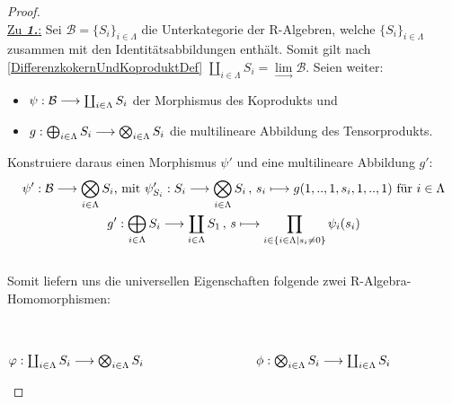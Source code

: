 \documentclass[10pt,a4paper]{report}
\newcommand{\functionfront}[3]{\nolinebreak{#1:#2 \longrightarrow #3}}
\newcommand{\function}[5]{\nolinebreak{#1:#2 \longrightarrow #3 \, , \, #4 \longmapsto #5}}
\newcommand{\colimes}[0]{\lim\limits_{ \longrightarrow }}
\begin{document}
\begin{proof} \ \\
\underline{Zu \textit{\textbf{1.}}:} Sei $\mathcal{B} = \lbrace S_i \rbrace_{i \in \Lambda}$ die Unterkategorie der R-Algebren, welche $\lbrace S_i \rbrace_{i \in \Lambda}$ zusammen mit den Identitätsabbildungen enthält. Somit gilt nach \cref{DifferenzkokernUndKoproduktDef} $\coprod_{i \in \Lambda} S_i = \colimes \mathcal{B}$. Seien weiter:
\begin{itemize}
\item[]$\functionfront{\psi}{\mathcal{B}}{\coprod_{i \in \Lambda} S_i}$ der Morphismus des Koprodukts und
\item[]$\functionfront{g}{\bigoplus_{i \in \Lambda} S_i}{\bigotimes_{i \in \Lambda} S_i}$ die multilineare Abbildung des Tensorprodukts.
\end{itemize}
Konstruiere daraus einen Morphismus $\psi'$ und eine multilineare Abbildung $g'$:
\begin{gather*}
\functionfront{\psi'}{\mathcal{B}}{\bigotimes_{i \in \Lambda} S_i} \text{, mit } \function{\psi'_{S_i}}{S_i}{\bigotimes_{i \in \Lambda} S_i}{s_i}{g(1,..,1,s_i,1,..,1)} \text{ für } i \in \Lambda\\
\function{g'}{\bigoplus_{i \in \Lambda} S_i}{\coprod_{i \in \Lambda} S_1}{s}{\prod_{i \in \lbrace i \in \Lambda \vert s_i \neq 0 \rbrace} \psi_i(s_i)}
\end{gather*}
\ \\
Somit liefern uns die universellen Eigenschaften folgende zwei R-Algebra-Homomorphismen:
\begin{center}
\ \\
\ \\
$\functionfront{\varphi}{\coprod_{i \in \Lambda} S_i}{\bigotimes_{i \in \Lambda} S_i} \hspace{9 em} \functionfront{\phi}{\bigotimes_{i \in \Lambda} S_i}{\coprod_{i \in \Lambda} S_i}$
\end{center}

\end{proof}
\end{document}
